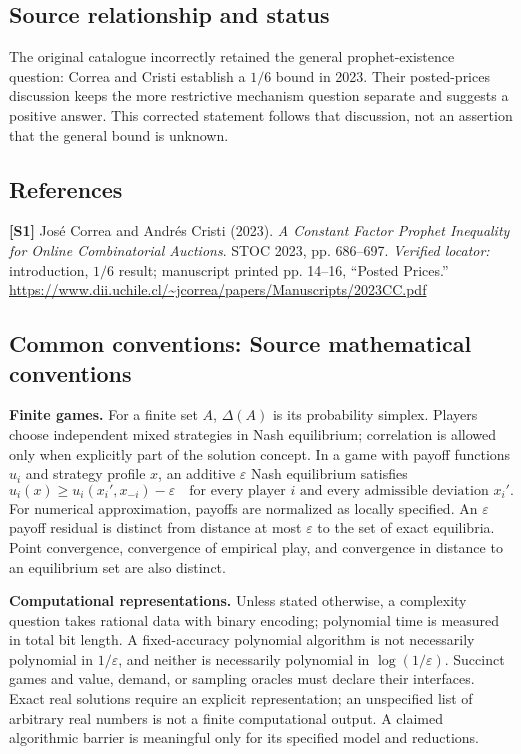 \documentclass[11pt,a4paper]{article}
\begin{document}
\subsection*{Source relationship and status}
The original catalogue incorrectly retained the general prophet-existence question: Correa and Cristi establish a $1/6$ bound in 2023. Their posted-prices discussion keeps the more restrictive mechanism question separate and suggests a positive answer. This corrected statement follows that discussion, not an assertion that the general bound is unknown.
\subsection*{References}
\begingroup\footnotesize\raggedright
\textbf{[S1]} Jos\'e Correa and Andr\'es Cristi (2023). \emph{A Constant Factor Prophet Inequality for Online Combinatorial Auctions}. STOC 2023, pp. 686--697. \textit{Verified locator:} introduction, $1/6$ result; manuscript printed pp. 14--16, ``Posted Prices.'' \url{https://www.dii.uchile.cl/~jcorrea/papers/Manuscripts/2023CC.pdf}
\par\endgroup

\subsection*{Common conventions: Source mathematical conventions}

\textbf{Finite games.} For a finite set $A$, $\Delta(A)$ is its probability
simplex. Players choose independent mixed strategies in Nash equilibrium;
correlation is allowed only when explicitly part of the solution concept.
In a game with payoff functions $u_i$ and strategy profile $x$, an additive
$\varepsilon$ Nash equilibrium satisfies
\[
 u_i(x)\geq u_i(x_i',x_{-i})-\varepsilon
 \quad\text{for every player $i$ and every admissible deviation $x_i'$}.
\]
For numerical approximation, payoffs are normalized as locally specified.
An $\varepsilon$ payoff residual is distinct from distance at most
$\varepsilon$ to the set of exact equilibria. Point convergence, convergence
of empirical play, and convergence in distance to an equilibrium set are
also distinct.

\textbf{Computational representations.} Unless stated otherwise, a complexity
question takes rational data with binary encoding; polynomial time is measured
in total bit length. A fixed-accuracy polynomial algorithm is not necessarily
polynomial in $1/\varepsilon$, and neither is necessarily polynomial in
$\log(1/\varepsilon)$. Succinct games and value, demand, or sampling oracles
must declare their interfaces. Exact real solutions require an explicit
representation; an unspecified list of arbitrary real numbers is not a
finite computational output. A claimed algorithmic barrier is meaningful
only for its specified model and reductions.
\end{document}
